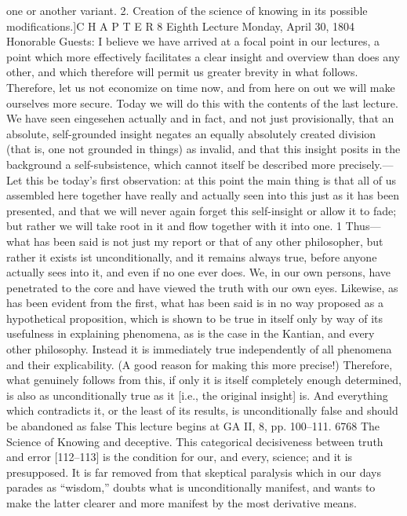 one or another variant. 2. Creation of the science of knowing in its possible
modifications.]C H A P T E R
8
Eighth Lecture
Monday, April 30, 1804
Honorable Guests:
I believe we have arrived at a focal point in our lectures, a point which more
effectively facilitates a clear insight and overview than does any other, and
which therefore will permit us greater brevity in what follows. Therefore, let
us not economize on time now, and from here on out we will make ourselves
more secure. Today we will do this with the contents of the last lecture.
We have seen {eingesehen} actually and in fact, and not just provisionally,
that an absolute, self-grounded insight negates an equally absolutely created
division (that is, one not grounded in things) as invalid, and that this insight
posits in the background a self-subsistence, which cannot itself be described
more precisely.—Let this be today’s first observation: at this point the main
thing is that all of us assembled here together have really and actually seen
into this just as it has been presented, and that we will never again forget this
self-insight or allow it to fade; but rather we will take root in it and flow
together with it into one. 1
Thus—what has been said is not just my report or that of any other
philosopher, but rather it exists {ist} unconditionally, and it remains always
true, before anyone actually sees into it, and even if no one ever does. We, in
our own persons, have penetrated to the core and have viewed the truth with
our own eyes. Likewise, as has been evident from the first, what has been said
is in no way proposed as a hypothetical proposition, which is shown to be true
in itself only by way of its usefulness in explaining phenomena, as is the case
in the Kantian, and every other philosophy. Instead it is immediately true
independently of all phenomena and their explicability. (A good reason for
making this more precise!) Therefore, what genuinely follows from this, if
only it is itself completely enough determined, is also as unconditionally true
as it [i.e., the original insight] is. And everything which contradicts it, or the
least of its results, is unconditionally false and should be abandoned as false
This lecture begins at GA II, 8, pp. 100–111.
6768
The Science of Knowing
and deceptive. This categorical decisiveness between truth and error
[112–113] is the condition for our, and every, science; and it is presupposed.
It is far removed from that skeptical paralysis which in our days parades as
“wisdom,” doubts what is unconditionally manifest, and wants to make the
latter clearer and more manifest by the most derivative means.
